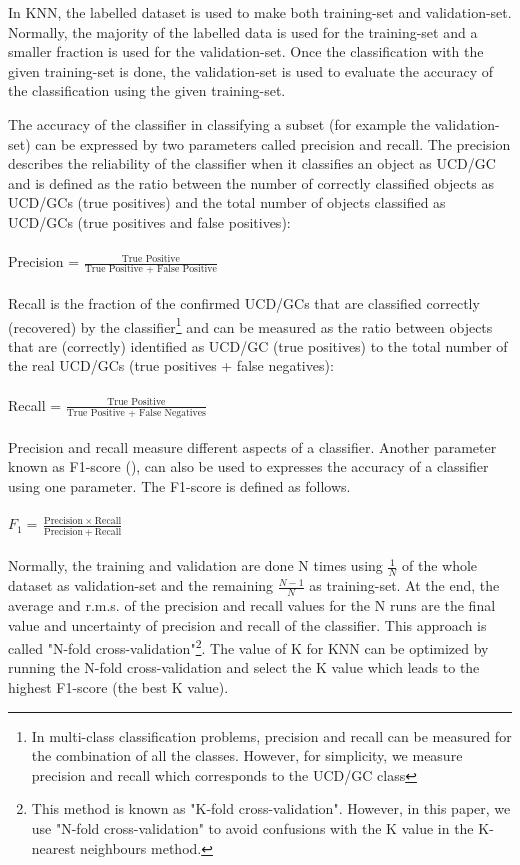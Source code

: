 \documentclass[fleqn,usenatbib]{mnras}
\begin{document}
In KNN, the labelled dataset is used to make both training-set and validation-set. Normally, the majority of the labelled data is used for the training-set and a smaller fraction is used for the validation-set. Once the classification with the given training-set is done, the validation-set is used to evaluate the accuracy of the classification using the given training-set.

The accuracy of the classifier in classifying a subset (for example the validation-set) can be expressed by two parameters called precision and recall. The precision describes the reliability of the classifier when it classifies an object as UCD/GC and is defined as the ratio between the number of correctly classified objects as UCD/GCs (true positives) and the total number of objects classified as UCD/GCs (true positives and false positives): \\\\
Precision = $\frac{\text{True Positive}}{\text{True Positive + False Positive}}$ \\\\
Recall is the fraction of the confirmed UCD/GCs that are classified correctly (recovered) by the classifier\footnote{In multi-class classification problems, precision and recall can be measured for the combination of all the classes. However, for simplicity, we measure precision and recall which corresponds to the UCD/GC class} and can be measured as the ratio between objects that are (correctly) identified as UCD/GC (true positives) to the total number of the real UCD/GCs (true positives + false negatives):\\\\
Recall = $\frac{\text{True Positive}}{\text{True Positive + False Negatives}}$
\\\\
Precision and recall measure different aspects of a classifier. Another parameter known as F1-score (\citealp{f1}), can also be used to expresses the accuracy of a classifier using one parameter. The F1-score is defined as follows. \\\\
$F_{1}=\frac{\text{Precision} \: \times \: \text{Recall}}{\text{Precision}\: + \: \text{Recall}}$ \; \;
\\\\

Normally, the training and validation are done N times using $\frac{1}{N}$ of the whole dataset as validation-set and the remaining $\frac{N-1}{N}$ as training-set. At the end, the average and r.m.s. of the precision and recall values for the N runs are the final value and uncertainty of precision and recall of the classifier. This approach is called "N-fold cross-validation"\footnote{This method is known as "K-fold cross-validation". However, in this paper, we use "N-fold cross-validation" to avoid confusions with the K value in the K-nearest neighbours method.}. The value of K for KNN can be optimized by running the N-fold cross-validation and select the K value which leads to the highest F1-score (the best K value).
\end{document}
